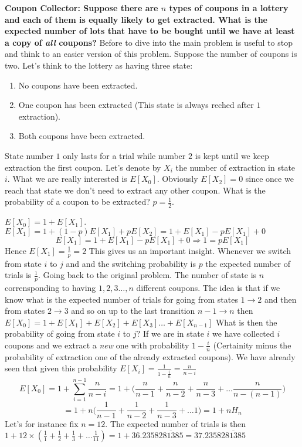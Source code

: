 \begin{framed}
\begin{example}
\textbf{Coupon Collector: Suppose there are $n$ types of coupons in a lottery and each of them is equally likely to get extracted. What is the expected number of lots that have to be bought until we have at least a copy of \textit{all} coupons?}
Before to dive into the main problem is useful to stop and think to an easier version of this problem. Suppose the number of coupons is two. Let's think to the lottery as having three state:
\begin{enumerate}
	\item No coupons have been extracted.
	\item One coupon has been extracted (This state is always reched after $1$ extraction).
	\item Both coupons have been extracted. 
\end{enumerate}
State number $1$ only lasts for a trial while number $2$ is kept until we keep extraction the first coupon.
Let's denote by $X_i$ the number of extraction in state $i$. What we are really interested is $E[X_0]$. Obviously $E[X_2]=0$ since once we reach that state we don't need to extract any other coupon. What is the probability of a coupon to be extracted? $p=\frac{1}{2}$. 

$E[X_0] = 1 + E[X_1]$.  
$E[X_1] = 1 + (1-p)E[X_1] + pE[X_2] = 1+E[X_1]-pE[X_1]+0$
\[
E[X_1] =  1+E[X_1]-pE[X_1]+0 \Rightarrow 1 = pE[X_1]
\]
Hence $E[X_1] = \frac{1}{p} = 2$
This gives us an important insight.  Whenever we switch from state $i$ to $j$ and and the switching probability is $p$ the expected number of trials is $\frac{1}{p}$.
Going back to the original problem. The number of state is $n$ corrensponding to having $1,2,3 	\ldots, n$ different coupons. The idea is that if we know what is the expected number of trials for going from states $1 \rightarrow 2$ and then from states $2 \rightarrow 3$ and so on up to the last transition $n-1 \rightarrow n$ then $E[X_0] = 1 +  E[X_1] + E[X_2] +E[X_3] \ldots +E[X_{n-1}]$ What is then the probability of going from state $i$ to $j$? If we are in state $i$ we have collected $i$ coupons and we extract a \textit{new} one with probability $1 - \frac{i}{n}$ (Certainity minus the probability of extraction one of the already extracted coupons). We have already seen that given this probability $E[X_i] = \frac{1}{1 - \frac{i}{n}} = \frac{n}{n-i}$
\[
E[X_0] = 1+ \sum_{i=1}^{n-1} \frac{n}{n-i} = 1+ \Big(\frac{n}{n-1}+\frac{n}{n-2}+\frac{n}{n-3}+ \ldots \frac{n}{n-(n-1)}\Big)
\]
\[
= 1+n \Big(\frac{1}{n-1}+\frac{1}{n-2}+\frac{1}{n-3}+ \ldots 1 \Big) = 1 + nH_n
\]
Let's for instance fix $n=12$. The expected number of trials is then $1+12 \times (\frac{1}{1}+\frac{1}{2}+\frac{1}{3}+\ldots \frac{1}{11}) = 1+ 36.2358\overline{281385} =  37.2358\overline{281385}$ 
\end{example}


\end{framed}

